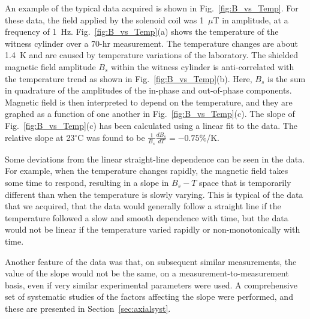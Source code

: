 An example of the typical data acquired is shown in
Fig.~\ref{fig:B_vs_Temp}.  For these data, the field applied by the
solenoid coil was 1~$\mu$T in amplitude, at a frequency of 1~Hz.
Fig.~\ref{fig:B_vs_Temp}(a) shows the temperature of the witness
cylinder over a 70-hr measurement.  The temperature changes are about
1.4~K and are caused by temperature variations of the laboratory.
%
%
The shielded magnetic field amplitude $B_s$ within the witness
cylinder is anti-correlated with the temperature trend as shown in
Fig.~\ref{fig:B_vs_Temp}(b).  Here, $B_s$ is the sum in quadrature of
the amplitudes of the in-phase and out-of-phase components.  Magnetic
field is then interpreted to depend on the temperature, and they are
graphed as a function of one another in Fig.~\ref{fig:B_vs_Temp}(c).
The slope of Fig.~\ref{fig:B_vs_Temp}(c) has been calculated using a
linear fit to the data.  The relative slope at 23$^\circ$C was found
to be $\frac{1}{B_s}\frac{dB_s}{dT}=-0.75\%$/K.

Some deviations from the linear straight-line dependence can be seen
in the data.  For example, when the temperature changes rapidly, the
magnetic field takes some time to respond, resulting in a slope in
$B_s-T$ space that is temporarily different than when the temperature
is slowly varying.  This is typical of the data that we acquired, that
the data would generally follow a straight line if the temperature
followed a slow and smooth dependence with time, but the data would
not be linear if the temperature varied rapidly or non-monotonically
with time.

Another feature of the data was that, on subsequent similar
measurements, the value of the slope would not be the same, on a
measurement-to-measurement basis, even if very similar experimental
parameters were used.  A comprehensive set of systematic studies of
the factors affecting the slope were performed, and these are
presented in Section~\ref{sec:axialsyst}.  



